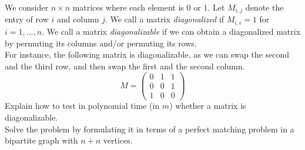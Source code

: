 \documentclass{article}
\begin{document}
\begin{exercise}
We consider $n\times n$ matrices where each element is $0$ or $1$. Let $M_{i,j}$ denote the entry of row $i$ and column $j$. We call a matrix \textit{diagonalized} if $M_{i,i}=1$ for $i = 1, \dots, n$. We call a matrix \textit{diagonalizable} if we can obtain a diagonalized matrix by permuting its columns and/or permuting its rows. \\
For instance, the following matrix is diagonalizable, as we can swap the second and the third row, and then swap the first and the second column.\begin{equation*}
    M = \left(\begin{array}{ccc}
         0&1&1  \\
         0&0&1\\
         1&0&0
    \end{array}\right)
\end{equation*}
Explain how to test in polynomial time (in $m$) whether a matrix is diagonalizable. \\
Solve the problem by formulating it in terms of a perfect matching problem in a bipartite graph with $n+n$ vertices.
\end{exercise}
\end{document}
